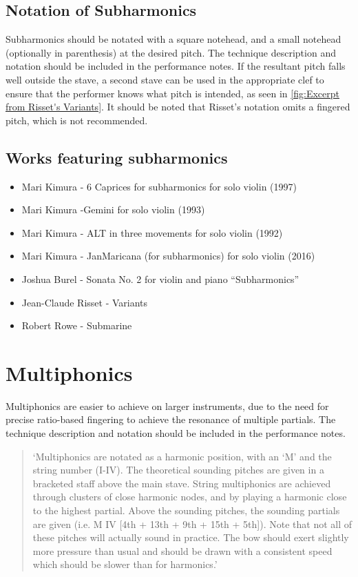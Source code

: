 \subsection{Notation of Subharmonics} \label{sec:notation-subharmonics}
Subharmonics should be notated with a square notehead, and a small notehead (optionally in parenthesis) at the desired pitch.
The technique description and notation should be included in the performance notes.
If the resultant pitch falls well outside the stave, a second stave can be used in the appropriate clef to ensure that the performer knows what pitch is intended, as seen in \autoref{fig:Excerpt from Risset's Variants}.\autocite[]{rissetVariants1995}
It should be noted that Risset's notation omits a fingered pitch, which is not recommended.

\subsection{Works featuring subharmonics }\label{sec:subharmonicsLiterature}

\begin{itemize}
    \item Mari Kimura - 6 Caprices for subharmonics for solo violin (1997) 
    \item Mari Kimura -Gemini for solo violin (1993)
    \item Mari Kimura - ALT in three movements for solo violin (1992)
    \item Mari Kimura - JanMaricana (for subharmonics) for solo violin (2016)
    \item Joshua Burel - Sonata No. 2 for violin and piano “Subharmonics”
    \item Jean-Claude Risset - Variants
    \item Robert Rowe - Submarine
\end{itemize}

\section{Multiphonics} \label{sec:multiphonics}
Multiphonics are easier to achieve on larger instruments, due to the need for precise ratio-based fingering to achieve the resonance of multiple partials.
The technique description and notation should be included in the performance notes.

\begin{quotation}
  `Multiphonics are notated as a harmonic position, with an `M' and the string number (I-IV). 
  The theoretical sounding pitches are given in a bracketed staff above the main stave.
  String multiphonics are achieved through clusters of close harmonic nodes, and by playing a harmonic close to the highest partial.
  Above the sounding pitches, the sounding partials are given (i.e. M IV [4th + 13th + 9th + 15th + 5th]).
  Note that not all of these pitches will actually sound in practice.
  The bow should exert slightly more pressure than usual and should be drawn with a consistent speed which should be slower than for harmonics.'
\end{quotation}

